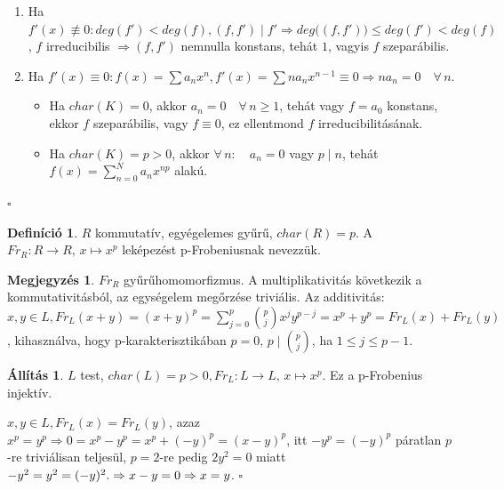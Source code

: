 \documentclass{article}
\theoremstyle{definition}
\newtheorem{all}[tetel]{Állítás}
\newtheorem{megj}[tetel]{Megjegyzés}
\newtheorem{defi}[tetel]{Definíció}
\newenvironment{biz}{\par\noindent{\bf Bizonyítás.}\enspace\ignorespaces}{\hfill$\square$\par}
\begin{document}
\begin{biz}
    \begin{enumerate}
        \item Ha $f'(x) \not\equiv 0: deg(f') < deg(f), (f, f') \mid f' \Rightarrow deg\big((f, f')\big) \le deg(f') < deg(f)$, $f$ irreducibilis $\Rightarrow (f, f')$ nemnulla konstans, tehát $1$, vagyis $f$ szeparábilis.
        \item Ha $f'(x) \equiv 0: f(x) = \sum a_nx^n, f'(x) = \sum na_nx^{n-1} \equiv 0 \Rightarrow na_n = 0 \quad \forall \, n$.
        \begin{itemize}
            \item Ha $char(K) = 0$, akkor $a_n = 0 \quad \forall \, n \ge 1$, tehát vagy $f = a_0$ konstans, ekkor $f$ szeparábilis, vagy $f \equiv 0$, ez ellentmond $f$ irreducibilitásának.
            \item Ha $char(K) = p > 0$, akkor $\forall \, n: \quad a_n = 0$ vagy $p \mid n$, tehát $f(x) = \sum_{n=0}^{N} a_nx^{np}$ alakú.
        \end{itemize}
    \end{enumerate}
\end{biz}

\begin{defi}
    $R$ kommutatív, egyégelemes gyűrű, $char(R) = p$. A $Fr_R: R \rightarrow R, \, x \mapsto x^p$ leképezést p-Frobeniusnak nevezzük.
\end{defi}

\begin{megj}
    $Fr_R$ gyűrűhomomorfizmus. A multiplikativitás következik a kommutativitásból, az egységelem megőrzése triviális. Az additivitás: $x, y \in L, Fr_L(x + y) = (x + y)^p = \sum_{j=0}^{p} \binom{p}{j}x^jy^{p-j} = x^p + y^p = Fr_L(x) + Fr_L(y)$, kihasználva, hogy p-karakterisztikában $p = 0, \, p \mid \binom{p}{j}$, ha $1 \le j \le p-1$.
\end{megj}

\begin{all}
    $L$ test, $char(L) = p > 0, Fr_L: L \rightarrow L, \, x \mapsto x^p$. Ez a p-Frobenius injektív.
\end{all}

\begin{biz}
    $x, y \in L, Fr_L(x)= Fr_L(y)$, azaz $x^p = y^p \Rightarrow 0 = x^p - y^p = x^p + (-y)^p = (x - y)^p$, itt $-y^p = (-y)^p$ páratlan $p$-re triviálisan teljesül, $p = 2$-re pedig $2y^2 = 0$ miatt $-y^2 = y^2 = (-y)^2. \\ \Rightarrow x - y = 0 \Rightarrow x = y$.
\end{biz}
\end{document}
